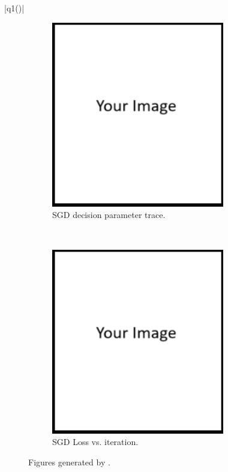 \documentclass{article}
\theoremstyle{definition}
\begin{document}
\begin{enumerate}[label=\ref{partsgd}.\alph*]
\begin{enumerate}[label=1.1.a.\roman*]
			|q1()|
			\begin{figure}[h]
				\centering
				\begin{subfigure}[t]{0.5\textwidth}
					\centering
					\includegraphics[height=3.2in]{image.png}
					\caption{SGD decision parameter trace.}
				\end{subfigure}%
				~ 
				\begin{subfigure}[t]{0.5\textwidth}
					\centering
					\includegraphics[height=3.2in]{image.png}
					\caption{SGD Loss vs. iteration.}
				\end{subfigure}
				\caption{Figures generated by .}
			\end{figure}


\end{enumerate}
\end{enumerate}
\end{document}
